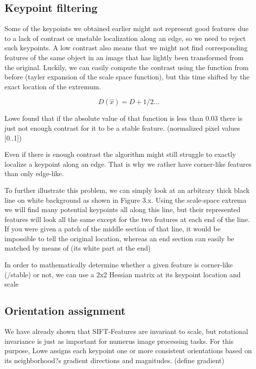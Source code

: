 \documentclass{article}
\begin{document}
	
	
	
	\subsection{Keypoint filtering}
	
	Some of the keypoints we obtained earlier might not represent good features due to a lack of contrast or unstable localization along an edge, so we need to reject such keypoints. 
	A low contrast also means that we might not find corresponding features of the same object in an image that has lightly been transformed from the original. Luckily, we can easily compute the contrast using the function from before (tayler expansion of the scale space function), but this time shifted by the exact location of the extremum. 
	
	$$
	D(\hat x) = D + 1/2 ...
	$$
	
	Lowe found that if the absolute value of that function is less than 0.03 there is just not enough contrast for it to be a stable feature. (normalized pixel values [0..1])
	
	Even if there is enough contrast the algorithm might still struggle to exactly localize a keypoint along an edge. That is why we rather have corner-like features than only edge-like.
	
	To further illustrate this problem, we can simply look at an arbitrary thick black line on white background as shown in Figure 3.x. Using the scale-space extrema we will find many potential keypoints all along this line, but their represented features will look all the same except for the two features at each end of the line. If you were given a patch of the middle section of that line, it would be impossible to tell the original location, whereas an end section can easily be matched by means of (its white part at the end)
	
	In order to mathematically determine whether a given feature is corner-like (/stable) or not, we can use a 2x2 Hessian matrix at its keypoint location and scale 
	
	\subsection{Orientation assignment}
	
	We have already shown that SIFT-Features are invariant to scale, but rotational invariance is just as important for numerus image processing tasks. For this purpose, Lowe assigns each keypoint one or more consistent orientations based on its neighborhood?s gradient directions and magnitudes.
	(define gradient)
	
\end{document}
